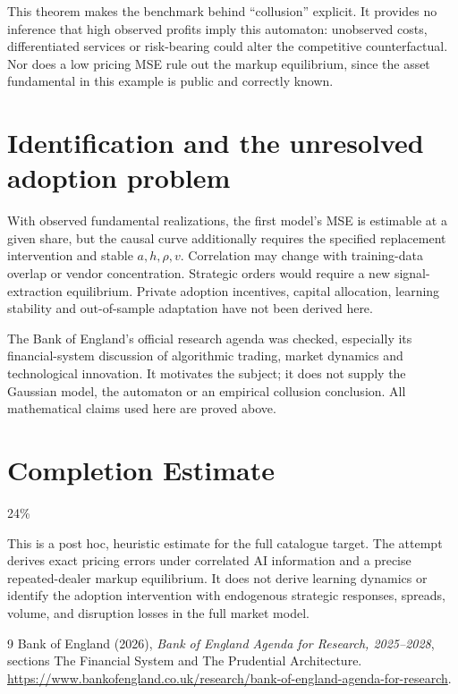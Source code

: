 \documentclass[11pt]{article}
\theoremstyle{remark}\newtheorem{remark}[theorem]{Remark}
\begin{document}
This theorem makes the benchmark behind ``collusion'' explicit. It provides no inference that high observed profits imply this automaton: unobserved costs, differentiated services or risk-bearing could alter the competitive counterfactual. Nor does a low pricing MSE rule out the markup equilibrium, since the asset fundamental in this example is public and correctly known.

\section*{Identification and the unresolved adoption problem}
With observed fundamental realizations, the first model's MSE is estimable at a given share, but the causal curve additionally requires the specified replacement intervention and stable $a,h,\rho,v$. Correlation may change with training-data overlap or vendor concentration. Strategic orders would require a new signal-extraction equilibrium. Private adoption incentives, capital allocation, learning stability and out-of-sample adaptation have not been derived here.

The Bank of England's official research agenda was checked, especially its financial-system discussion of algorithmic trading, market dynamics and technological innovation. It motivates the subject; it does not supply the Gaussian model, the automaton or an empirical collusion conclusion. All mathematical claims used here are proved above.

\section{Completion Estimate}
24\%

This is a post hoc, heuristic estimate for the full catalogue target.
The attempt derives exact pricing errors under correlated AI information and a precise repeated-dealer markup equilibrium. It does not derive learning dynamics or identify the adoption intervention with endogenous strategic responses, spreads, volume, and disruption losses in the full market model.

\begin{thebibliography}{9}
 Bank of England (2026), \emph{Bank of England Agenda for Research, 2025--2028}, sections The Financial System and The Prudential Architecture. \url{https://www.bankofengland.co.uk/research/bank-of-england-agenda-for-research}.
\end{thebibliography}
\end{document}
